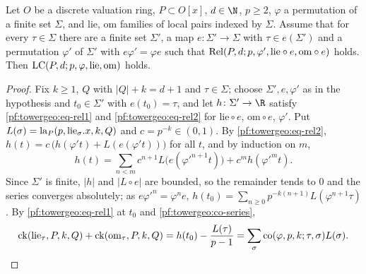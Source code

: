 \begin{lemma}\label{pf:towergeo:orbits}
Let $O$ be a discrete valuation ring, $P\subset O[x]$, $d\in\N$, $p\ge2$, $\varphi$ a permutation of a finite
set $\Sigma$, and $\mathrm{lie}$, $\mathrm{om}$ families of local pairs indexed by $\Sigma$. Assume that for
every $\tau\in\Sigma$ there are a finite set $\Sigma'$, a map $e\colon\Sigma'\to\Sigma$ with
$\tau\in e(\Sigma')$ and a permutation $\varphi'$ of $\Sigma'$ with $e\varphi'=\varphi e$ such that
$\mathrm{Rel}(P,d;p,\varphi',\mathrm{lie}\circ e,\mathrm{om}\circ e)$ holds. Then
$\mathrm{LC}(P,d;p,\varphi,\mathrm{lie},\mathrm{om})$ holds.
\end{lemma}

\begin{proof}
Fix $k\ge1$, $Q$ with $|Q|+k=d+1$ and $\tau\in\Sigma$; choose $\Sigma',e,\varphi'$ as in the hypothesis and
$t_0\in\Sigma'$ with $e(t_0)=\tau$, and let $h\colon\Sigma'\to\R$ satisfy \eqref{pf:towergeo:eq-rel1} and
\eqref{pf:towergeo:eq-rel2} for $\mathrm{lie}\circ e$, $\mathrm{om}\circ e$, $\varphi'$. Put
$L(\sigma)=\operatorname{la}_P(p,\mathrm{lie}_\sigma.x,k,Q)$ and $c=p^{-k}\in(0,1)$. By
\eqref{pf:towergeo:eq-rel2}, $h(t)=c\,\bigl(h(\varphi't)+L(e(\varphi't))\bigr)$ for all $t$, and by induction
on $m$,
\[
h(t)=\sum_{n<m}c^{n+1}L\bigl(e(\varphi'^{n+1}t)\bigr)+c^mh(\varphi'^mt).
\]
Since $\Sigma'$ is finite, $|h|$ and $|L\circ e|$ are bounded, so the remainder tends to $0$ and the series
converges absolutely; as $e\varphi'^n=\varphi^ne$, $h(t_0)=\sum_{n\ge0}p^{-k(n+1)}L(\varphi^{n+1}\tau)$. By
\eqref{pf:towergeo:eq-rel1} at $t_0$ and \cref{pf:towergeo:co-series},
\[
\operatorname{ck}(\mathrm{lie}_\tau,P,k,Q)+\operatorname{ck}(\mathrm{om}_\tau,P,k,Q)=h(t_0)-\frac{L(\tau)}{p-1}
=\sum_\sigma\operatorname{co}(\varphi,p,k;\tau,\sigma)L(\sigma).\qedhere
\]
\end{proof}

